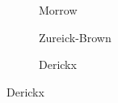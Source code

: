 \begin{frame}[plain]
\begin{figure}[h]
\begin{subfigure}{0.10\textwidth}
	\caption{\;\;\;\scriptsize{Morrow}}
	\end{subfigure} \hspace{0.6cm}
	\begin{subfigure}{0.20\textwidth}
	\captionsetup{labelformat=empty}
	\centering
	\caption{\scriptsize Zureick-Brown}
	\end{subfigure} \hspace{0cm}
	\begin{subfigure}{0.10\textwidth}
	\captionsetup{labelformat=empty}
	\centering
	\caption{\;\;\scriptsize{Derickx}}
	\end{subfigure} \hfill \phantom{.}
	\end{figure}
\end{frame}
